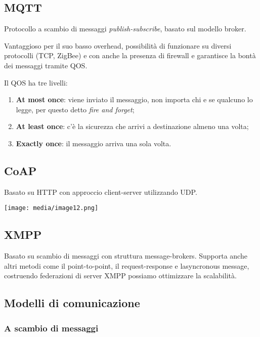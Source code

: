 \subsection{MQTT}\label{mqtt}

Protocollo a scambio di messaggi \emph{publish-subscribe}, basato sul
modello broker.

Vantaggioso per il suo basso overhead, possibilità di funzionare su
diversi protocolli (TCP, ZigBee) e con anche la presenza di firewall e
garantisce la bontà dei messaggi tramite QOS.

Il QOS ha tre livelli:

\begin{enumerate}
\def\labelenumi{\arabic{enumi}.}
\setcounter{enumi}{-1}
\item
  \textbf{At most once}: viene inviato il messaggio, non importa chi e
  se qualcuno lo legge, per questo detto \emph{fire and forget};
\item
  \textbf{At least once}: c'è la sicurezza che arrivi a destinazione
  almeno una volta;
\item
  \textbf{Exactly once}: il messaggio arriva una sola volta.
\end{enumerate}

\subsection{CoAP}\label{coap}

Basato su HTTP con approccio client-server utilizzando UDP.

\texttt{[image: media/image12.png]}

\subsection{XMPP}\label{xmpp}

Basato su scambio di messaggi con struttura message-brokers. Supporta
anche altri metodi come il point-to-point, il request-response e
l\textquotesingle asyncronous message, costruendo federazioni di server
XMPP possiamo ottimizzare la scalabilità.

\subsection{Modelli di comunicazione}\label{modelli-di-comunicazione}

\subsubsection{A scambio di messaggi}\label{a-scambio-di-messaggi}

